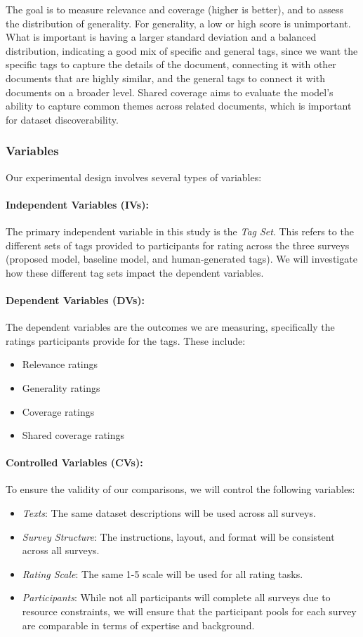 The goal is to measure relevance and coverage (higher is better), and to assess the distribution of generality. For generality, a low or high score is unimportant. What is important is having a larger standard deviation and a balanced distribution, indicating a good mix of specific and general tags, since we want the specific tags to capture the details of the document, connecting it with other documents that are highly similar, and the general tags to connect it with documents on a broader level. Shared coverage aims to evaluate the model's ability to capture common themes across related documents, which is important for dataset discoverability.


\subsubsection{Variables}
Our experimental design involves several types of variables:

\paragraph{Independent Variables (IVs):}
The primary independent variable in this study is the \textit{Tag Set}. This refers to the different sets of tags provided to participants for rating across the three surveys (proposed model, baseline model, and human-generated tags). We will investigate how these different tag sets impact the dependent variables.

\paragraph{Dependent Variables (DVs):}
The dependent variables are the outcomes we are measuring, specifically the ratings participants provide for the tags. These include:
\begin{itemize}
\item Relevance ratings
\item Generality ratings
\item Coverage ratings
\item Shared coverage ratings
\end{itemize}

\paragraph{Controlled Variables (CVs):}
To ensure the validity of our comparisons, we will control the following variables:
\begin{itemize}
\item \textit{Texts}: The same dataset descriptions will be used across all surveys.
\item \textit{Survey Structure}: The instructions, layout, and format will be consistent across all surveys.
\item \textit{Rating Scale}: The same 1-5 scale will be used for all rating tasks.
\item \textit{Participants}: While not all participants will complete all surveys due to resource constraints, we will ensure that the participant pools for each survey are comparable in terms of expertise and background.
\end{itemize}

